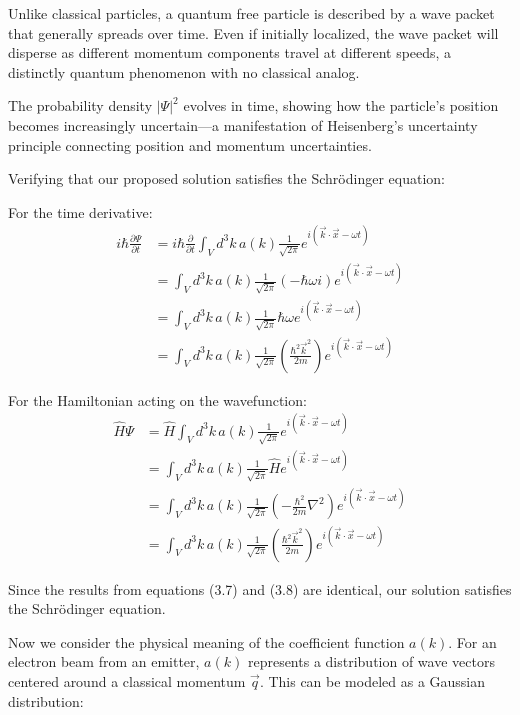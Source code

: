 \documentclass[10pt]{article}
\begin{document}
Unlike classical particles, a quantum free particle is described by a wave packet that generally spreads over time. Even if initially localized, the wave packet will disperse as different momentum components travel at different speeds, a distinctly quantum phenomenon with no classical analog.

The probability density $|\Psi|^2$ evolves in time, showing how the particle's position becomes increasingly uncertain—a manifestation of Heisenberg's uncertainty principle connecting position and momentum uncertainties.


Verifying that our proposed solution satisfies the Schrödinger equation:

For the time derivative:
\begin{align*}
i\hbar\frac{\partial\Psi}{\partial t} &= i\hbar\frac{\partial}{\partial t}\int_V d^3k\,a(k)\frac{1}{\sqrt{2\pi}}e^{i(\vec{k}\cdot\vec{x}-\omega t)} \\
&= \int_V d^3k\,a(k)\frac{1}{\sqrt{2\pi}}(-\hbar\omega i)e^{i(\vec{k}\cdot\vec{x}-\omega t)} \\
&= \int_V d^3k\,a(k)\frac{1}{\sqrt{2\pi}}\hbar\omega e^{i(\vec{k}\cdot\vec{x}-\omega t)} \tag{3.7} \\
&= \int_V d^3k\,a(k)\frac{1}{\sqrt{2\pi}}\left(\frac{\hbar^2\vec{k}^2}{2m}\right)e^{i(\vec{k}\cdot\vec{x}-\omega t)}
\end{align*}

For the Hamiltonian acting on the wavefunction:
\begin{align*}
\hat{H}\Psi &= \hat{H}\int_V d^3k\,a(k)\frac{1}{\sqrt{2\pi}}e^{i(\vec{k}\cdot\vec{x}-\omega t)} \\
&= \int_V d^3k\,a(k)\frac{1}{\sqrt{2\pi}}\hat{H}e^{i(\vec{k}\cdot\vec{x}-\omega t)} \\
&= \int_V d^3k\,a(k)\frac{1}{\sqrt{2\pi}}\left(-\frac{\hbar^2}{2m}\nabla^2\right)e^{i(\vec{k}\cdot\vec{x}-\omega t)} \tag{3.8} \\
&= \int_V d^3k\,a(k)\frac{1}{\sqrt{2\pi}}\left(\frac{\hbar^2\vec{k}^2}{2m}\right)e^{i(\vec{k}\cdot\vec{x}-\omega t)}
\end{align*}

Since the results from equations (3.7) and (3.8) are identical, our solution satisfies the Schrödinger equation.

Now we consider the physical meaning of the coefficient function $a(k)$. For an electron beam from an emitter, $a(k)$ represents a distribution of wave vectors centered around a classical momentum $\vec{q}$. This can be modeled as a Gaussian distribution:
\end{document}
